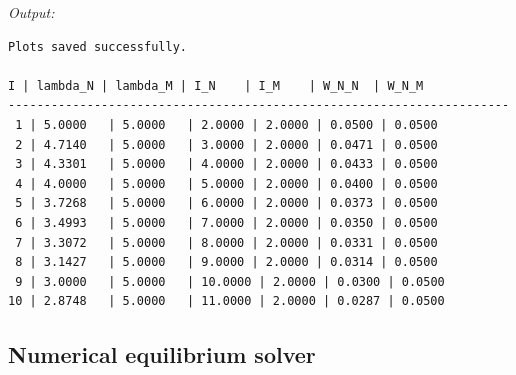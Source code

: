 \noindent\textit{Output:}
\begin{lstlisting}[style=outputstyle]
Plots saved successfully.

I | lambda_N | lambda_M | I_N    | I_M    | W_N_N  | W_N_M
----------------------------------------------------------------------
 1 | 5.0000   | 5.0000   | 2.0000 | 2.0000 | 0.0500 | 0.0500
 2 | 4.7140   | 5.0000   | 3.0000 | 2.0000 | 0.0471 | 0.0500
 3 | 4.3301   | 5.0000   | 4.0000 | 2.0000 | 0.0433 | 0.0500
 4 | 4.0000   | 5.0000   | 5.0000 | 2.0000 | 0.0400 | 0.0500
 5 | 3.7268   | 5.0000   | 6.0000 | 2.0000 | 0.0373 | 0.0500
 6 | 3.4993   | 5.0000   | 7.0000 | 2.0000 | 0.0350 | 0.0500
 7 | 3.3072   | 5.0000   | 8.0000 | 2.0000 | 0.0331 | 0.0500
 8 | 3.1427   | 5.0000   | 9.0000 | 2.0000 | 0.0314 | 0.0500
 9 | 3.0000   | 5.0000   | 10.0000 | 2.0000 | 0.0300 | 0.0500
10 | 2.8748   | 5.0000   | 11.0000 | 2.0000 | 0.0287 | 0.0500
\end{lstlisting}

\subsection{Numerical equilibrium solver}

